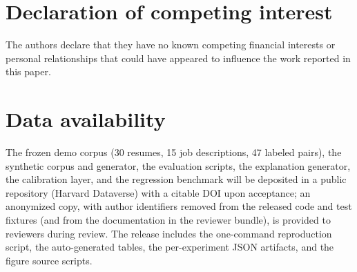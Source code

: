 \documentclass[preprint,review,3p,times,twocolumn,authoryear]{elsarticle}
\begin{document}
\section*{Declaration of competing interest}
The authors declare that they have no known competing financial
interests or personal relationships that could have appeared to
influence the work reported in this paper.

\section*{Data availability}
The frozen demo corpus (30 resumes, 15 job descriptions, 47 labeled
pairs), the synthetic corpus and generator, the evaluation scripts,
the explanation generator, the calibration layer, and the regression
benchmark will be deposited in a public repository (Harvard Dataverse)
with a citable DOI upon acceptance; an anonymized copy, with author
identifiers removed from the released code and test fixtures (and from the
documentation in the reviewer bundle), is provided to reviewers during
review. The release includes the one-command
reproduction script, the auto-generated tables, the per-experiment JSON
artifacts, and the figure source scripts.



\end{document}
